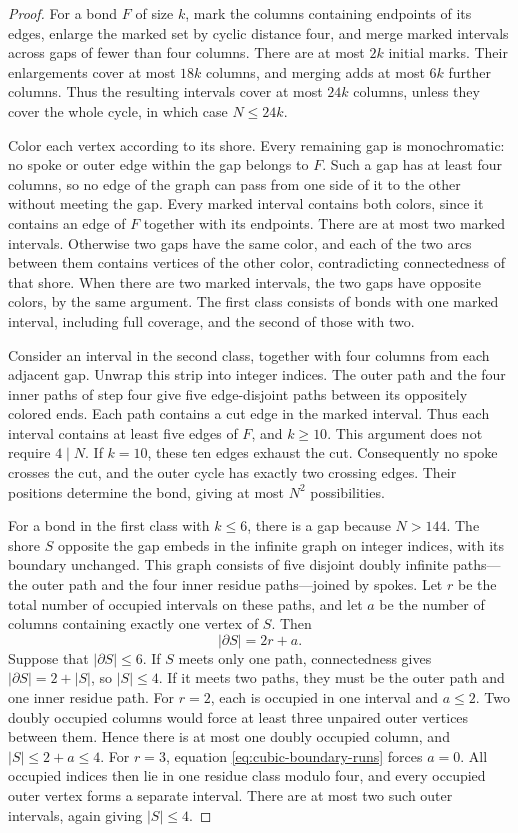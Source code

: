 \documentclass[11pt,reqno]{amsart}
\theoremstyle{remark}
\numberwithin{equation}{section}
\begin{document}
\begin{proof}
For a bond $F$ of size $k$, mark the columns containing endpoints of
its edges, enlarge the marked set by cyclic distance four, and merge
marked intervals across gaps of fewer than four columns. There are
at most $2k$ initial marks. Their enlargements cover at most $18k$
columns, and merging adds at most $6k$ further columns. Thus the
resulting intervals cover at most $24k$ columns, unless they cover
the whole cycle, in which case $N\le24k$.

Color each vertex according to its shore. Every remaining gap is
monochromatic: no spoke or outer edge within the gap belongs to
$F$. Such a gap has at least four columns, so no edge of the graph
can pass from one side of it to the other without meeting the gap.
Every marked interval contains both colors, since it contains an
edge of $F$ together with its endpoints. There are at most two marked
intervals. Otherwise two gaps have the same color, and each of the
two arcs between them contains vertices of the other color,
contradicting connectedness of that shore. When there are two marked
intervals, the two gaps have opposite colors, by the same argument.
The first class consists of bonds with one marked interval, including
full coverage, and the second of those with two.

Consider an interval in the second class, together with four columns
from each adjacent gap. Unwrap this strip into integer indices.
The outer path and the four inner paths of step four give five
edge-disjoint paths between its oppositely colored ends. Each path
contains a cut edge in the marked interval. Thus each interval
contains at least five edges of $F$, and $k\ge10$. This argument
does not require $4\mid N$. If $k=10$, these ten edges exhaust the
cut. Consequently no spoke crosses the cut, and the outer cycle has
exactly two crossing edges. Their positions determine the bond,
giving at most $N^2$ possibilities.

For a bond in the first class with $k\le6$, there is a gap because
$N>144$. The shore $S$ opposite the gap embeds in the infinite graph
on integer indices, with its boundary unchanged. This graph consists
of five disjoint doubly infinite paths---the outer path and the four
inner residue paths---joined by spokes. Let $r$ be the total number
of occupied intervals on these paths, and let $a$ be the number of
columns containing exactly one vertex of $S$. Then
\begin{equation}\label{eq:cubic-boundary-runs}
 |\partial S|=2r+a.
\end{equation}
Suppose that $|\partial S|\le6$. If $S$ meets only one path,
connectedness gives $|\partial S|=2+|S|$, so $|S|\le4$.
If it meets two paths, they must be the outer path and one inner
residue path. For $r=2$, each is occupied in one interval and
$a\le2$. Two doubly occupied columns would force at least three
unpaired outer vertices between them. Hence there is at most one
doubly occupied column, and $|S|\le2+a\le4$. For $r=3$, equation
\eqref{eq:cubic-boundary-runs} forces $a=0$. All occupied indices
then lie in one residue class modulo four, and every occupied outer
vertex forms a separate interval. There are at most two such outer
intervals, again giving $|S|\le4$.


\end{proof}
\end{document}
